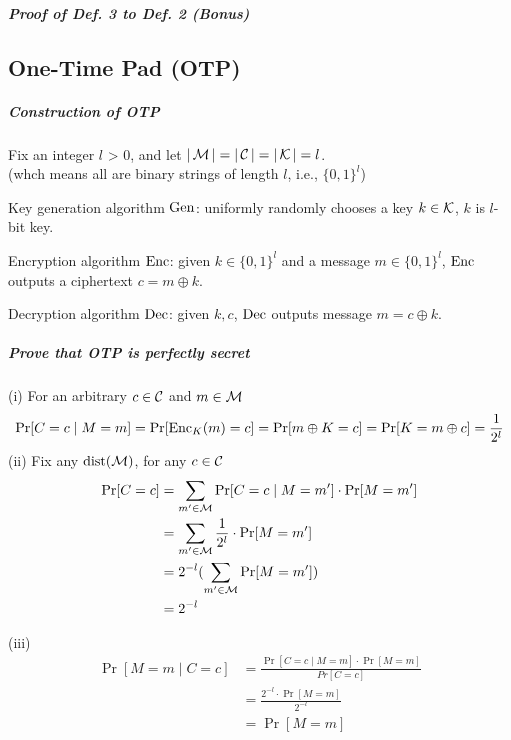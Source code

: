 \subparagraph{Proof of Def. 3 to Def. 2 (Bonus)}



\subsection{One-Time Pad (OTP)}

\subparagraph{Construction of OTP}

Fix an integer \(l\) > 0, and let \(|\operatorname{\mathcal{M}}| = |\operatorname{\mathcal{C}}| = |\operatorname{\mathcal{K}}| = l\). \\
(whch means all are binary strings of length \(l\), i.e., \(\{0, 1\}^l\))

Key generation algorithm \(\operatorname{Gen}\): uniformly randomly chooses a key \(k \in \operatorname{\mathcal{K}}\), \(k\) is \(l\)-bit key.

Encryption algorithm \(\operatorname{Enc}\): given \(k \in \{0, 1\}^l\) and a message \(m \in \{0, 1\}^l\), \(\operatorname{Enc}\) outputs a ciphertext \(c = m \oplus k\).

Decryption algorithm \(\operatorname{Dec}\): given \(k, c\), \(\operatorname{Dec}\) outputs message \(m = c \oplus k\).

\subparagraph{Prove that OTP is perfectly secret}

\begin{myProof}
	(i) For an arbitrary \(c \in \operatorname{\mathcal{C}}\) and \(m \in \operatorname{\mathcal{M}}\) \\
	\[ \Pr[C = c \mid M = m] = \Pr[\operatorname{Enc}_K(m) = c] = \Pr[m \oplus K = c] = \Pr[K = m \oplus c] = \frac{1}{2^l}\]
	(ii) Fix any \(\operatorname{dist}(\operatorname{\mathcal{M}})\), for any \(c \in \operatorname{\mathcal{C}}\)
	\begin{align*}
		\Pr [C = c] &= \sum_{m' \in \operatorname{\mathcal{M}}} \Pr[C = c \mid M = m'] \cdot \Pr[M = m'] \\
		&= \sum_{m' \in \operatorname{\mathcal{M}}} \frac{1}{2^l} \cdot \Pr[M = m'] \\
		&= 2^{-l} (\sum_{m' \in \operatorname{\mathcal{M}}} \Pr[M = m']) \\
		&= 2^{-l}
	\end{align*}
	
	(iii)
	\begin{align*}
		\Pr[M = m \mid C = c] &= \frac{\Pr[C = c \mid M = m] \cdot \Pr[M = m]}{Pr[C = c]} \\
		&= \frac{2^{-l} \cdot \Pr[M = m]}{2^{-l}} \\
		&= \Pr[M = m]
	\end{align*}
\end{myProof}

